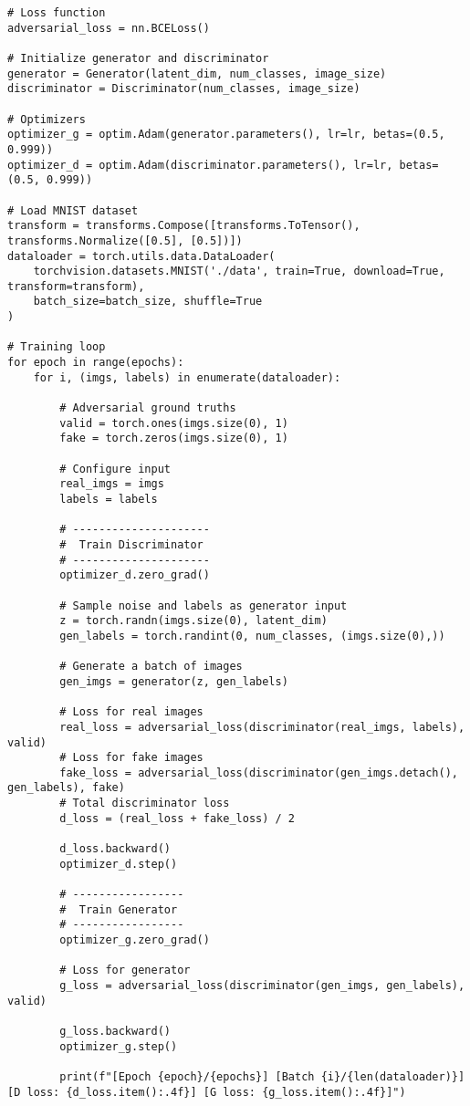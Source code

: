 \begin{lstlisting}[style=python]
# Loss function
adversarial_loss = nn.BCELoss()

# Initialize generator and discriminator
generator = Generator(latent_dim, num_classes, image_size)
discriminator = Discriminator(num_classes, image_size)

# Optimizers
optimizer_g = optim.Adam(generator.parameters(), lr=lr, betas=(0.5, 0.999))
optimizer_d = optim.Adam(discriminator.parameters(), lr=lr, betas=(0.5, 0.999))

# Load MNIST dataset
transform = transforms.Compose([transforms.ToTensor(), transforms.Normalize([0.5], [0.5])])
dataloader = torch.utils.data.DataLoader(
    torchvision.datasets.MNIST('./data', train=True, download=True, transform=transform),
    batch_size=batch_size, shuffle=True
)

# Training loop
for epoch in range(epochs):
    for i, (imgs, labels) in enumerate(dataloader):
        
        # Adversarial ground truths
        valid = torch.ones(imgs.size(0), 1)
        fake = torch.zeros(imgs.size(0), 1)

        # Configure input
        real_imgs = imgs
        labels = labels

        # ---------------------
        #  Train Discriminator
        # ---------------------
        optimizer_d.zero_grad()

        # Sample noise and labels as generator input
        z = torch.randn(imgs.size(0), latent_dim)
        gen_labels = torch.randint(0, num_classes, (imgs.size(0),))

        # Generate a batch of images
        gen_imgs = generator(z, gen_labels)

        # Loss for real images
        real_loss = adversarial_loss(discriminator(real_imgs, labels), valid)
        # Loss for fake images
        fake_loss = adversarial_loss(discriminator(gen_imgs.detach(), gen_labels), fake)
        # Total discriminator loss
        d_loss = (real_loss + fake_loss) / 2

        d_loss.backward()
        optimizer_d.step()

        # -----------------
        #  Train Generator
        # -----------------
        optimizer_g.zero_grad()

        # Loss for generator
        g_loss = adversarial_loss(discriminator(gen_imgs, gen_labels), valid)

        g_loss.backward()
        optimizer_g.step()

        print(f"[Epoch {epoch}/{epochs}] [Batch {i}/{len(dataloader)}] [D loss: {d_loss.item():.4f}] [G loss: {g_loss.item():.4f}]")
\end{lstlisting}

